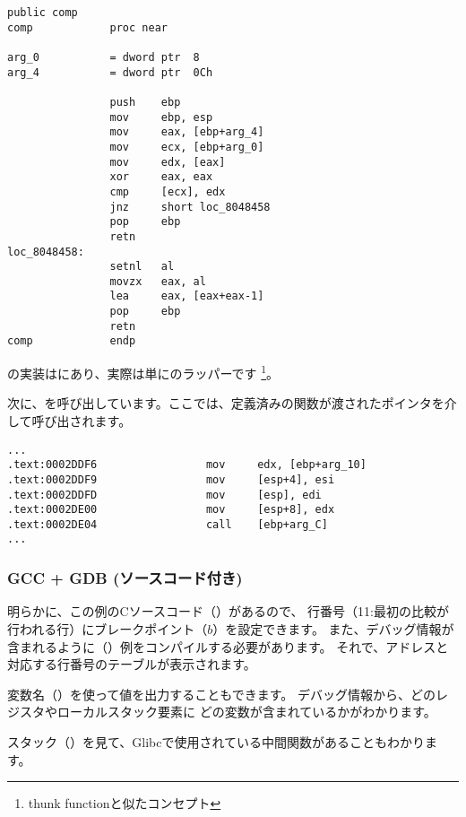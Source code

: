 \begin{lstlisting}[style=customasmx86]
                public comp
comp            proc near

arg_0           = dword ptr  8
arg_4           = dword ptr  0Ch

                push    ebp
                mov     ebp, esp
                mov     eax, [ebp+arg_4]
                mov     ecx, [ebp+arg_0]
                mov     edx, [eax]
                xor     eax, eax
                cmp     [ecx], edx
                jnz     short loc_8048458
                pop     ebp
                retn
loc_8048458:
                setnl   al
                movzx   eax, al
                lea     eax, [eax+eax-1]
                pop     ebp
                retn
comp            endp
\end{lstlisting}


\qsort の実装はにあり、実際は単にのラッパーです
\footnote{\gls{thunk function}と似たコンセプト}。

次に、を呼び出しています。ここでは、定義済みの関数が渡されたポインタを介して呼び出されます。

\begin{lstlisting}[caption=(file libc.so.6{,} glibc version---2.10.1),style=customasmx86]
...
.text:0002DDF6                 mov     edx, [ebp+arg_10]
.text:0002DDF9                 mov     [esp+4], esi
.text:0002DDFD                 mov     [esp], edi
.text:0002DE00                 mov     [esp+8], edx
.text:0002DE04                 call    [ebp+arg_C]
...
\end{lstlisting}

\subsubsection{GCC + GDB (ソースコード付き)}

明らかに、この例のCソースコード（）があるので、
行番号（11:最初の比較が行われる行）にブレークポイント（$b$）を設定できます。 
また、デバッグ情報が含まれるように（）例をコンパイルする必要があります。
それで、アドレスと対応する行番号のテーブルが表示されます。

変数名（）を使って値を出力することもできます。
デバッグ情報から、どのレジスタやローカルスタック要素に
どの変数が含まれているかがわかります。

スタック（）を見て、Glibcで使用されている中間関数があることもわかります。

